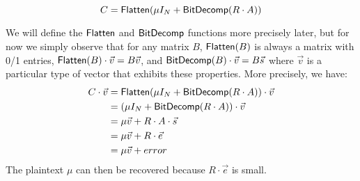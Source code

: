 $$C = \mathsf{Flatten}(\mu I_N + \mathsf{BitDecomp}(R\cdot A))$$

We will define the $\mathsf{Flatten}$ and $\mathsf{BitDecomp}$ functions more precisely later, but for now we simply observe that for any matrix $B$, $\mathsf{Flatten}(B)$ is always a matrix with 0/1 entries, $\mathsf{Flatten}(B)\cdot \vec{v} = B\vec{v}$, and $\mathsf{BitDecomp}(B)\cdot \vec{v} = B\vec{s}$ where $\vec{v}$ is a particular type of vector that exhibits these properties.  More precisely, we have:
\begin{align*}
C\cdot \vec{v} &= \mathsf{Flatten}(\mu I_N + \mathsf{BitDecomp}(R\cdot A))\cdot \vec{v}\\
&= (\mu I_N + \mathsf{BitDecomp}(R\cdot A))\cdot \vec{v}\\
&= \mu \vec{v} + R\cdot A \cdot \vec{s} \\
&= \mu \vec{v} + R\cdot \vec{e}\\
&= \mu \vec{v} + error
\end{align*}
The plaintext $\mu$ can then be recovered because $R\cdot \vec{e}$ is small.    


